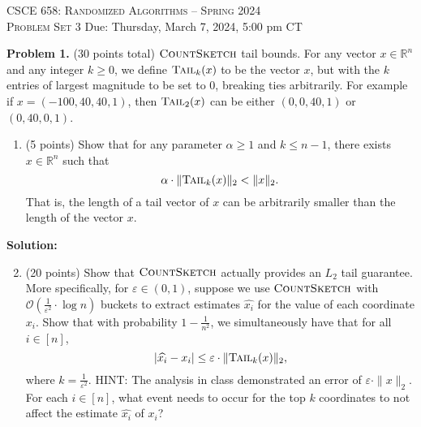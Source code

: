 \documentclass[11pt]{article}
\newcommand{\eps}{\varepsilon}
\newcommand{\tail}{\textsc{Tail}}
\newcommand{\CountSketch}{\textsc{CountSketch}}
\begin{document}
\begin{center}
{\Large\textsc{CSCE 658: Randomized Algorithms -- Spring 2024 \\ 
Problem Set 3}}
\vskip 0.1in
Due: Thursday, March 7, 2024, 5:00 pm CT
\end{center}


\noindent
\textbf{Problem 1.} (30 points total)
$\CountSketch$ tail bounds. 
\vskip 0.1in\noindent
For any vector $x\in\mathbb{R}^n$ and any integer $k\ge 0$, we define $\tail_k(x)$ to be the vector $x$, but with the $k$ entries of largest magnitude to be set to $0$, breaking ties arbitrarily. 
For example if $x=(-100, 40, 40, 1)$, then $\tail_2(x)$ can be either $(0, 0, 40, 1)$ or $(0, 40, 0, 1)$.
\begin{enumerate}
\item (5 points)
Show that for any parameter $\alpha\ge 1$ and $k\le n-1$, there exists $x\in\mathbb{R}^n$ such that
\[\alpha\cdot\|\tail_k(x)\|_2<\|x\|_2.\]
That is, the length of a tail vector of $x$ can be arbitrarily smaller than the length of the vector $x$.
\end{enumerate}

\noindent\textbf{Solution:}








\begin{enumerate}
\setcounter{enumi}{1}
\item (20 points)
Show that $\CountSketch$ actually provides an $L_2$ tail guarantee. 
More specifically, for $\eps\in(0,1)$, suppose we use $\CountSketch$ with $\mathcal{O}\left(\frac{1}{\eps^2}\cdot\log n\right)$ buckets to extract estimates $\widehat{x_i}$ for the value of each coordinate $x_i$. 
Show that with probability $1-\frac{1}{n^2}$, we simultaneously have that for all $i\in[n]$,
\[|\widehat{x_i}-x_i|\le\eps\cdot\|\tail_k(x)\|_2,\]
where $k=\frac{1}{\eps^2}$. 
\vskip 0.1in\noindent
HINT: The analysis in class demonstrated an error of $\eps\cdot\|x\|_2$. For each $i\in[n]$, what event needs to occur for the top $k$ coordinates to not affect the estimate $\widehat{x_i}$ of $x_i$?
\end{enumerate}
\end{document}
